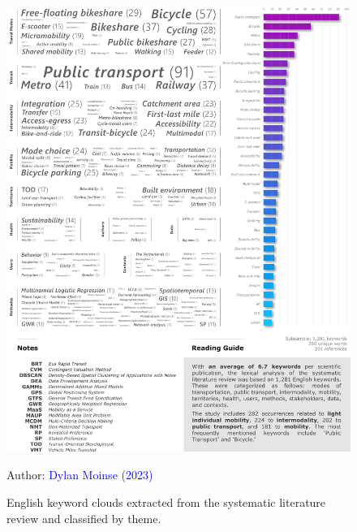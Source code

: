 \begin{refsegment}
    \begin{figure}[h!]\vspace*{4pt}
        \caption{English keyword clouds extracted from the systematic literature review and classified by theme.}
        \label{fig-chap2:nuage-mots-cles-rsl}
        \centerline{\includegraphics[width=1\columnwidth]{src/Figures/Chap-2/EN_RSL_Nuage_mots_cles_thematiques.pdf}}
        \vspace{5pt}
        \begin{flushright}\scriptsize{
        Author: \textcolor{blue}{Dylan Moinse (2023)}
        }\end{flushright}
    \end{figure}


\end{refsegment}
